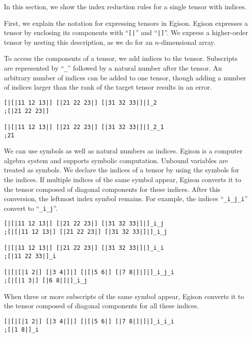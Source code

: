 \documentclass[acmlarge]{acmart}
\begin{document}
In this section, we show the index reduction rules for a single tensor with indices.

First, we explain the notation for expressing tensors in Egison.
Egison expresses a tensor by enclosing its components with ``\texttt{[|}'' and ``\texttt{|]}''.
We express a higher-order tensor by nesting this description, as we do for an $n$-dimensional array.

To access the components of a tensor, we add indices to the tensor.
Subscripts are represented by ``\verb|_|'' followed by a natural number after the tensor.
An arbitrary number of indices can be added to one tensor, though adding a number of indices larger than the rank of the target tensor results in an error.

{\footnotesize
\begin{verbatim}
[|[|11 12 13|] [|21 22 23|] [|31 32 33|]|]_2
;[|21 22 23|]

[|[|11 12 13|] [|21 22 23|] [|31 32 33|]|]_2_1
;21
\end{verbatim}
}


We can use symbols as well as natural numbers as indices.
Egison is a computer algebra system and supports symbolic computation.
Unbound variables are treated as symbols.
We declare the indices of a tensor by using the symbols for the indices.
If multiple indices of the same symbol appear, Egison converts it to the tensor composed of diagonal components for these indices.
After this conversion, the leftmost index symbol remains.
For example, the indices ``\verb|_i_j_i|'' convert to ``\verb|_i_j|''.

{\footnotesize
\begin{verbatim}
[|[|11 12 13|] [|21 22 23|] [|31 32 33|]|]_i_j
;[|[|11 12 13|] [|21 22 23|] [|31 32 33|]|]_i_j

[|[|11 12 13|] [|21 22 23|] [|31 32 33|]|]_i_i
;[|11 22 33|]_i

[|[|[|1 2|] [|3 4|]|] [|[|5 6|] [|7 8|]|]|]_i_j_i
;[|[|1 3|] [|6 8|]|]_i_j
\end{verbatim}
}

When three or more subscripts of the same symbol appear, Egison converts it to the tensor composed of diagonal components for all these indices.

{\footnotesize
\begin{verbatim}
[|[|[|1 2|] [|3 4|]|] [|[|5 6|] [|7 8|]|]|]_i_i_i
;[|1 8|]_i
\end{verbatim}
}
\end{document}
